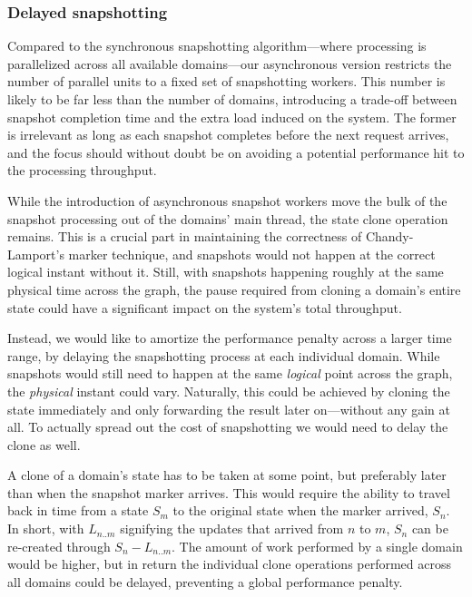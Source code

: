 \subsubsection{Delayed snapshotting}

Compared to the synchronous snapshotting algorithm---where processing is
parallelized across all available domains---our asynchronous version restricts
the number of parallel units to a fixed set of snapshotting workers. This number
is likely to be far less than the number of domains, introducing a trade-off
between snapshot completion time and the extra load induced on the system. The
former is irrelevant as long as each snapshot completes before the next request
arrives, and the focus should without doubt be on avoiding a potential
performance hit to the processing throughput.

While the introduction of asynchronous snapshot workers move the bulk of the
snapshot processing out of the domains' main thread, the state clone operation
remains. This is a crucial part in maintaining the correctness of
Chandy-Lamport's marker technique, and snapshots would not happen at the correct
logical instant without it. Still, with snapshots happening roughly at the same
physical time across the graph, the pause required from cloning a domain's
entire state could have a significant impact on the system's total throughput.


Instead, we would like to amortize the performance penalty across a larger time
range, by delaying the snapshotting process at each individual domain. While
snapshots would still need to happen at the same \textit{logical} point across
the graph, the \textit{physical} instant could vary. Naturally, this could be
achieved by cloning the state immediately and only forwarding the result later
on---without any gain at all. To actually spread out the cost of snapshotting we
would need to delay the clone as well.

A clone of a domain's state has to be taken at some point, but preferably later
than when the snapshot marker arrives. This would require the ability to travel
back in time from a state $ S_m $ to the original state when the marker arrived,
$ S_n $. In short, with $ L_{n..m} $ signifying the updates that arrived from $
n $ to $ m $, $ S_n $ can be re-created through $ S_n - L_{n..m} $.
The amount of work performed by a single domain would be higher, but in return
the individual clone operations performed across all domains could be delayed,
preventing a global performance penalty.

